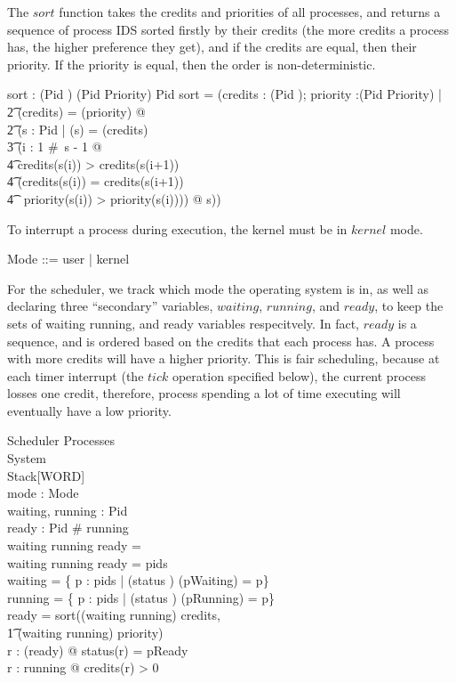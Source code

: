 \documentclass{article}
\begin{document}
The $sort$ function takes the credits and priorities of all processes,
and returns a sequence of process IDS sorted firstly by their credits
(the more credits a process has, the higher preference they get), and
if the credits are equal, then their priority. If the priority is
equal, then the order is non-deterministic.

\begin{axdef}
  sort : (Pid \pfun \nat) \cross (Pid \pfun Priority) \pfun \iseq Pid
\where
  sort =
    (\lambda credits : (Pid \pfun \nat); priority :(Pid \pfun Priority) |\\
    \t2 \dom(credits) = \dom(priority) @\\
    \t2 (\mu s : \iseq Pid | \ran(s) = \dom(credits) \land\\
      \t3 (\forall i : 1 \upto \#~s - 1 @\\
        \t4 credits(s(i)) > credits(s(i+1)) \lor\\
        \t4 (credits(s(i)) = credits(s(i+1)) \land\\
        \t4 \ priority(s(i)) > priority(s(i)))) @ s))
\end{axdef}

To interrupt a process during execution, the kernel must be in $kernel$ mode.

\begin{zed}
  Mode ::= user | kernel
\end{zed}

For the scheduler, we track which mode the operating system is in, as
well as declaring three ``secondary'' variables, $waiting$, $running$,
and $ready$, to keep the sets of waiting running, and ready variables
respecitvely. In fact, $ready$ is a sequence, and is ordered based on
the credits that each process has. A process with more credits will
have a higher priority. This is fair scheduling, because at each timer
interrupt (the $tick$ operation specified below), the current process
losses one credit, therefore, process spending a lot of time executing
will eventually have a low priority.

\begin{schema}{Scheduler}
  Processes\\
  System\\
  Stack[WORD]\\
  mode : Mode\\
  waiting, running : \power Pid\\
  ready : \iseq Pid
\where
  \# running \\
  waiting \cap running \cap \ran ready = \emptyset\\
  waiting \cup running \cup \ran ready = pids\\
  waiting = \{ p : pids | (status \inv) (pWaiting) = p\}\\
  running = \{ p : pids | (status \inv) (pRunning) = p\}\\
  ready = sort((waiting \cup running) \ndres credits, \\
    \t1 (waiting \cup running) \ndres priority)\\
  \forall r : \ran(ready) @ status(r) = pReady\\
  \forall r : running @ credits(r) > 0
\end{schema}
\end{document}
